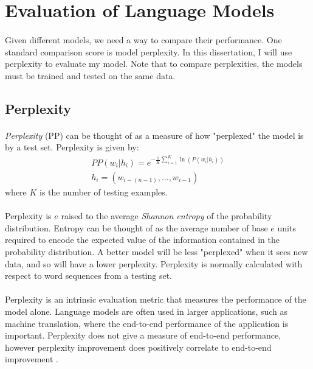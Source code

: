 \section {Evaluation of Language Models}
\paragraph{}
Given different models, we need a way to compare their performance. One standard comparison score is model perplexity. In this dissertation, I will use perplexity to evaluate my model. Note that to compare perplexities, the models must be trained and tested on the same data.
\subsection{Perplexity} \label{sec:perplexity}
\paragraph{}
\emph{Perplexity} (PP) can be thought of as a measure of how "perplexed" the model is by a test set.
Perplexity is given by:
\begin{align}
PP(w_i | h_i)=e^{- \frac{1}{K} \sum_{i=1}^K \ln( P(w_i | h_i) ) } \label{eq:perplexity}
\\ h_i = ( w_{i-(n-1)},\dots, w_{i-1} ) \nonumber
\end{align}
where $K$ is the number of testing examples. 
\paragraph{}
Perplexity is $e$ raised to the average \emph{Shannon entropy} of the probability distribution. Entropy can be thought of as the average number of base $e$ units required to encode the expected value of the information contained in the probability distribution. A better model will be less "perplexed" when it sees new data, and so will have a lower perplexity.  Perplexity is normally calculated with respect to word sequences from a testing set. 
\paragraph{}
Perplexity is an intrinsic evaluation metric that measures the performance of the model alone. Language models are often used in larger applications, such as machine translation, where the end-to-end performance of the application is important. Perplexity does not give a measure of end-to-end performance, however perplexity improvement does positively correlate to end-to-end improvement \cite{Jurafsky2009}.

